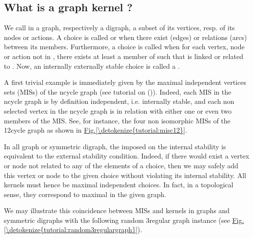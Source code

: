 \documentclass[a4paper,12pt,english]{sphinxhowto}
\begin{document}
\subsection{What is a graph kernel ?}
\label{\detokenize{tutorial:what-is-a-graph-kernel}}
We call  in a graph, respectively a digraph, a subset of its vertices, resp. of its nodes or actions. A choice  is called  or  when there exist  (edges) or relations (arcs) between its members. Furthermore, a choice  is called  when for each vertex, node or action  not in , there exists at least a member  of  such that  is linked or related to . Now, an internally  externally stable choice is called a .

A first trivial example is immediately given by the maximal independent vertices sets (MISs) of the n\sphinxhyphen{}cycle graph (see tutorial on {\hyperref[\detokenize{tutorial:isomorphicmis-tutorial-label}]{}} ()). Indeed, each MIS in the n\sphinxhyphen{}cycle graph is by definition independent, i.e. internally stable, and each non selected vertex in the n\sphinxhyphen{}cycle graph is in relation with either one or even two members of the MIS. See, for instance, the four non isomorphic MISs of the 12\sphinxhyphen{}cycle graph as shown in \hyperref[\detokenize{tutorial:misc12}]{Fig.\@ \ref{\detokenize{tutorial:misc12}}}.

In all graph or symmetric digraph, the  imposed on the internal stability is equivalent to the external stability condition. Indeed, if there would exist a vertex or node not related to any of the elements of a choice, then we may safely add this vertex or node to the given choice without violating its internal stability. All kernels must hence be maximal independent choices. In fact, in a topological sense, they correspond to maximal  in the given graph.

We may illustrate this coincidence between MISs and kernels in graphs
and symmetric digraphs with the following random 3\sphinxhyphen{}regular graph
instance (see \hyperref[\detokenize{tutorial:random3regulargraph}]{Fig.\@ \ref{\detokenize{tutorial:random3regulargraph}}}).
\end{document}
